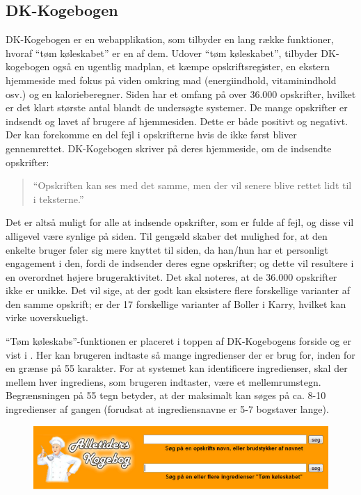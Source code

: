 \subsection{DK-Kogebogen}
\label{subsec:dk-kogebogen}

DK-Kogebogen er en webapplikation, som tilbyder en lang række funktioner, hvoraf ``tøm køleskabet'' er en af dem. Udover ``tøm køleskabet'', tilbyder DK-kogebogen også en ugentlig madplan, et kæmpe opskriftsregister, en ekstern hjemmeside med fokus på viden omkring mad (energiindhold, vitaminindhold osv.) og en kalorieberegner. Siden har et omfang på over 36.000 opskrifter, hvilket er det klart største antal blandt de undersøgte systemer. De mange opskrifter er indsendt og lavet af brugere af hjemmesiden. Dette er både positivt og negativt. Der kan forekomme en del fejl i opskrifterne hvis de ikke først bliver gennemrettet. DK-Kogebogen skriver på deres hjemmeside, om de indsendte opskrifter:

\begin{quote}
``Opskriften kan ses med det samme, men der vil senere blive rettet lidt til i teksterne.'' \cite{dk-kog-indtastopskrift}
\end{quote}

Det er altså muligt for alle at indsende opskrifter, som er fulde af fejl, og disse vil alligevel være synlige på siden. Til gengæld skaber det mulighed for, at den enkelte bruger føler sig mere knyttet til siden, da han/hun har et personligt engagement i den, fordi de indsender deres egne opskrifter; og dette vil resultere i en overordnet højere brugeraktivitet. Det skal noteres, at de 36.000 opskrifter ikke er unikke. Det vil sige, at der godt kan eksistere flere forskellige varianter af den samme opskrift; \fx er der 17 forskellige varianter af Boller i Karry, hvilket kan virke uoverskueligt.

``Tøm køleskabs''-funktionen er placeret i toppen af DK-Kogebogens forside og er vist i . Her kan brugeren indtaste så mange ingredienser der er brug for, inden for en grænse på 55 karakter. For at systemet kan identificere ingredienser, skal der mellem hver ingrediens, som brugeren indtaster, være et mellemrumstegn. Begrænsningen på 55 tegn betyder, at der maksimalt kan søges på ca. 8-10 ingredienser af gangen (forudsat at ingrediensnavne er 5-7 bogstaver lange).

\begin{figure}[H]
\centering
\includegraphics[scale=0.7]{billeder/forbilleder/dk-kogebogen.png}
\label{fig:dk-kogebogen1}
\end{figure}

